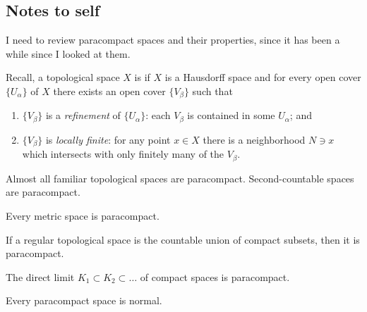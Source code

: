 \subsection{Notes to self}

I need to review paracompact spaces and their properties, since it has
been a while since I looked at them.

\begin{definition}
Recall, a topological space $X$ is  if $X$ is a
Hausdorff space and for every open cover $\{U_{\alpha}\}$ of $X$ there
exists an open cover $\{V_{\beta}\}$ such that
\begin{enumerate}
\item $\{V_{\beta}\}$ is a \emph{refinement} of $\{U_{\alpha}\}$: each
  $V_{\beta}$ is contained in some $U_{\alpha}$; and
\item $\{V_{\beta}\}$ is \emph{locally finite}: for any point $x\in X$
  there is a neighborhood $N\ni x$ which intersects with only finitely
  many of the $V_{\beta}$.
\end{enumerate}
\end{definition}

\begin{node}
Almost all familiar topological spaces are
paracompact. Second-countable spaces are paracompact.
\end{node}

\begin{theorem}[Stone]
Every metric space is paracompact.
\end{theorem}

\begin{theorem}[Morita]
If a regular topological space is the countable union of compact subsets,
then it is paracompact.
\end{theorem}

\begin{corollary}
The direct limit $K_{1}\subset K_{2}\subset\dots$ of compact spaces is paracompact.
\end{corollary}

\begin{theorem}[Dieudonn\'{e}]
Every paracompact space is normal.
\end{theorem}